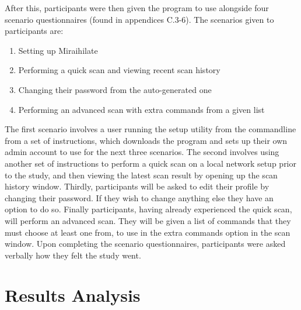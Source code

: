 \vspace{2cm}

After this, participants were then given the program to use alongside four scenario questionnaires (found in appendices C.3-6). The scenarios given to participants are:
\begin{enumerate}
	\item{Setting up Miraihilate}
	\item{Performing a quick scan and viewing recent scan history}
	\item{Changing their password from the auto-generated one}
	\item{Performing an advanced scan with extra commands from a given list}
\end{enumerate}

\vspace{0.5cm}

The first scenario involves a user running the setup utility from the commandline from a set of instructions, which downloads the program and sets up their own admin account to use for the next three scenarios. The second involves using another set of instructions to perform a quick scan on a local network setup prior to the study, and then viewing the latest scan result by opening up the scan history window. Thirdly, participants will be asked to edit their profile by changing their password. If they wish to change anything else they have an option to do so. Finally participants, having already experienced the quick scan, will perform an advanced scan. They will be given a list of commands that they must choose at least one from, to use in the extra commands option in the scan window. Upon completing the scenario questionnaires, participants were asked verbally how they felt the study went.

\section{Results Analysis}
